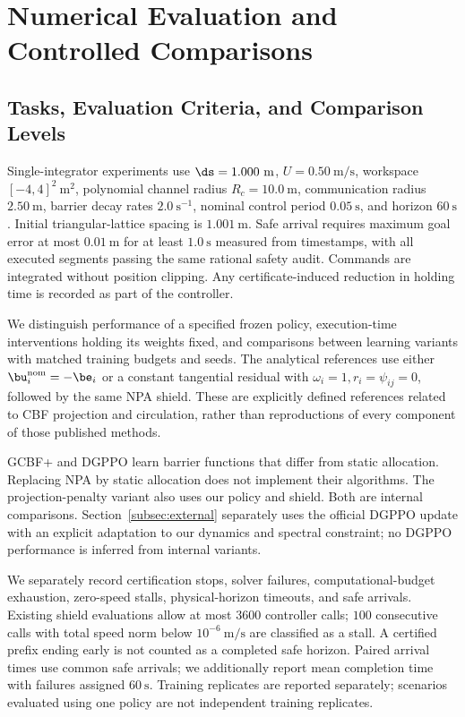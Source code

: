 \section{Numerical Evaluation and Controlled Comparisons}\label{sec:experiments}

\subsection{Tasks, Evaluation Criteria, and Comparison Levels}
Single-integrator experiments use $\ds=1.000\ \mathrm m$, $U=0.50\ \mathrm{m/s}$, workspace $[-4,4]^2\ \mathrm m^2$, polynomial channel radius $R_c=10.0\ \mathrm m$, communication radius $2.50\ \mathrm m$, barrier decay rates $2.0\ \mathrm s^{-1}$, nominal control period $0.05\ \mathrm s$, and horizon $60\ \mathrm s$. Initial triangular-lattice spacing is $1.001\ \mathrm m$. Safe arrival requires maximum goal error at most $0.01\ \mathrm m$ for at least $1.0\ \mathrm s$ measured from timestamps, with all executed segments passing the same rational safety audit. Commands are integrated without position clipping. Any certificate-induced reduction in holding time is recorded as part of the controller.

We distinguish performance of a specified frozen policy, execution-time interventions holding its weights fixed, and comparisons between learning variants with matched training budgets and seeds. The analytical references use either $\bu_i^{\mathrm{nom}}=-\be_i$ or a constant tangential residual with $\omega_i=1,r_i=\psi_{ij}=0$, followed by the same NPA shield. These are explicitly defined references related to CBF projection and circulation\cite{ames2017cbf,goncalves2023circulation}, rather than reproductions of every component of those published methods.

GCBF+\cite{zhang2025gcbf} and DGPPO\cite{zhang2025dgppo} learn barrier functions that differ from static allocation. Replacing NPA by static allocation does not implement their algorithms. The projection-penalty variant also uses our policy and shield. Both are internal comparisons. Section~\ref{subsec:external} separately uses the official DGPPO update with an explicit adaptation to our dynamics and spectral constraint; no DGPPO performance is inferred from internal variants.

We separately record certification stops, solver failures, computational-budget exhaustion, zero-speed stalls, physical-horizon timeouts, and safe arrivals. Existing shield evaluations allow at most $3600$ controller calls; $100$ consecutive calls with total speed norm below $10^{-6}\ \mathrm{m/s}$ are classified as a stall. A certified prefix ending early is not counted as a completed safe horizon. Paired arrival times use common safe arrivals; we additionally report mean completion time with failures assigned $60\ \mathrm s$. Training replicates are reported separately; scenarios evaluated using one policy are not independent training replicates.

